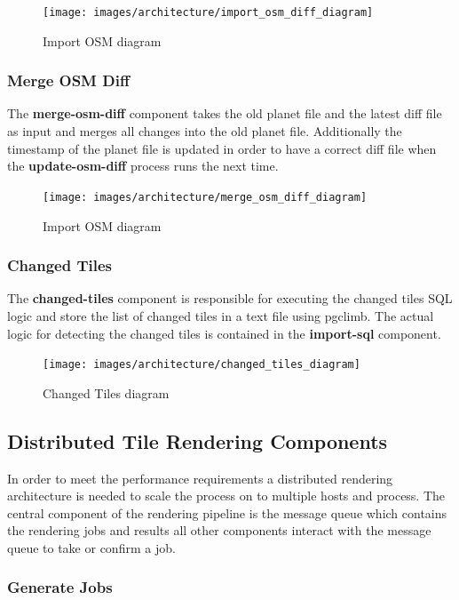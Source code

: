 \begin{figure}[H]
  \centering
  \texttt{[image: images/architecture/import\_osm\_diff\_diagram]}
  \caption{Import OSM diagram}
\end{figure}

\subsubsection{Merge OSM Diff}

The \textbf{merge-osm-diff} component takes the old planet file and the latest diff file as input and merges all changes into the old planet file. Additionally the timestamp of the planet file is updated in order to have a correct diff file when the \textbf{update-osm-diff} process runs the next time.

\begin{figure}[H]
  \centering
  \texttt{[image: images/architecture/merge\_osm\_diff\_diagram]}
  \caption{Import OSM diagram}
\end{figure}

\subsubsection{Changed Tiles}

The \textbf{changed-tiles} component is responsible for executing the changed tiles SQL logic and store the list of changed tiles in a text file using pgclimb. The actual logic for detecting the changed tiles is contained in the \textbf{import-sql} component.

\begin{figure}[H]
  \centering
  \texttt{[image: images/architecture/changed\_tiles\_diagram]}
  \caption{Changed Tiles diagram}
\end{figure}

\subsection{Distributed Tile Rendering Components}

In order to meet the performance requirements a distributed rendering architecture 
is needed to scale the process on to multiple hosts and process. The central component of the rendering pipeline is the message queue which contains the rendering jobs and results all other components interact with the message queue to take or confirm a job.

\subsubsection{Generate Jobs}

